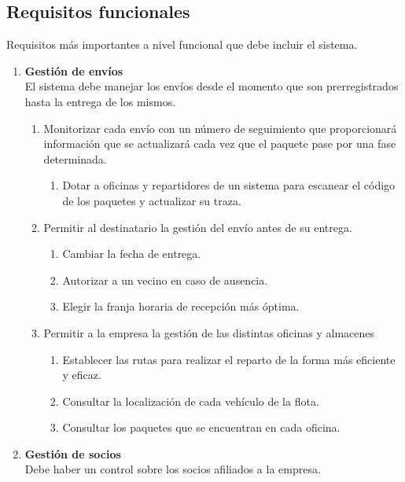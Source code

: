 \documentclass[12pt,spanish]{article}
\begin{document}
\subsection{Requisitos funcionales}
Requisitos más importantes a nivel funcional que debe incluir el sistema.
\begin{enumerate}[label=\textbf{RF-\arabic*}]
	\item \textbf{Gestión de envíos}\\
	El sistema debe manejar los envíos desde el momento que son prerregistrados hasta la 				entrega de los mismos.
	\begin{enumerate}[label=\textbf{RF-1.\arabic*}]
		\item Monitorizar cada envío con un número de seguimiento que proporcionará información 			que se actualizará cada vez que el paquete pase por una fase determinada.
		\begin{enumerate}[label=\textbf{RF-1.1.\arabic*}]
			\item Dotar a oficinas y repartidores de un sistema para escanear el código de los 					paquetes y actualizar su traza.
		\end{enumerate}
		\item Permitir al destinatario la gestión del envío antes de su entrega.
		\begin{enumerate}[label=\textbf{RF-1.2.\arabic*}]
			\item Cambiar la fecha de entrega.
			\item Autorizar a un vecino en caso de ausencia.
			\item Elegir la franja horaria de recepción más óptima.
		\end{enumerate}
		\item Permitir a la empresa la gestión de las distintas oficinas y almacenes
		\begin{enumerate}[label=\textbf{RF-1.3.\arabic*}]
			\item Establecer las rutas para realizar el reparto de la forma más 								eficiente y eficaz.
			\item Consultar la localización de cada vehículo de la flota.
			\item Consultar los paquetes que se encuentran en cada oficina.
		\end{enumerate}	
	\end{enumerate}
	\item \textbf{Gestión de socios}\\
	Debe haber un control sobre los socios afiliados a la empresa.
		\begin{enumerate}[label=\textbf{RF-2.\arabic*}]

\end{enumerate}
\end{enumerate}
\end{document}
